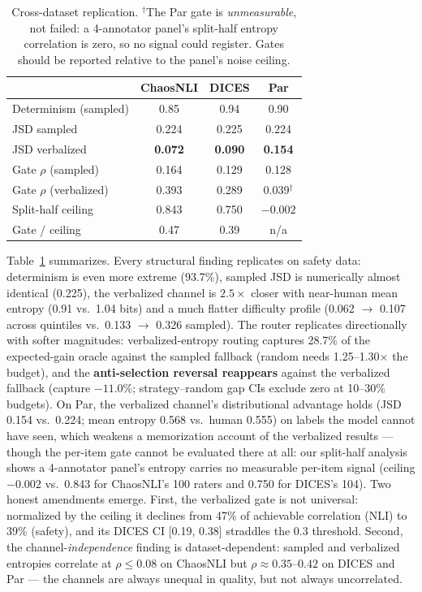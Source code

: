 \documentclass[11pt]{article}
\begin{document}
\begin{table}[t]
\centering
\small
\setlength{\tabcolsep}{3.5pt}
\begin{tabular}{lccc}
\toprule
 & ChaosNLI & DICES & Par \\
\midrule
Determinism (sampled) & 0.85 & 0.94 & 0.90 \\
JSD sampled & 0.224 & 0.225 & 0.224 \\
JSD verbalized & \textbf{0.072} & \textbf{0.090} & \textbf{0.154} \\
Gate $\rho$ (sampled) & 0.164 & 0.129 & 0.128 \\
Gate $\rho$ (verbalized) & 0.393 & 0.289 & 0.039$^{\dagger}$ \\
Split-half ceiling & 0.843 & 0.750 & $-0.002$ \\
Gate / ceiling & 0.47 & 0.39 & n/a \\
\bottomrule
\end{tabular}
\caption{Cross-dataset replication. $^{\dagger}$The Par gate is \emph{unmeasurable}, not failed: a 4-annotator panel's split-half entropy correlation is zero, so no signal could register. Gates should be reported relative to the panel's noise ceiling.}
\label{tab:generalize}
\end{table}

Table~\ref{tab:generalize} summarizes. Every structural finding replicates on safety data: determinism is even more extreme (93.7\%), sampled JSD is numerically almost identical (0.225), the verbalized channel is $2.5\times$ closer with near-human mean entropy (0.91 vs.\ 1.04 bits) and a much flatter difficulty profile (0.062 $\rightarrow$ 0.107 across quintiles vs.\ 0.133 $\rightarrow$ 0.326 sampled). The router replicates directionally with softer magnitudes: verbalized-entropy routing captures 28.7\% of the expected-gain oracle against the sampled fallback (random needs 1.25--1.30$\times$ the budget), and the \textbf{anti-selection reversal reappears} against the verbalized fallback (capture $-11.0$\%; strategy--random gap CIs exclude zero at 10--30\% budgets). On Par, the verbalized channel's distributional advantage holds (JSD 0.154 vs.\ 0.224; mean entropy 0.568 vs.\ human 0.555) on labels the model cannot have seen, which weakens a memorization account of the verbalized results --- though the per-item gate cannot be evaluated there at all: our split-half analysis shows a 4-annotator panel's entropy carries no measurable per-item signal (ceiling $-0.002$ vs.\ 0.843 for ChaosNLI's 100 raters and 0.750 for DICES's 104). Two honest amendments emerge. First, the verbalized gate is not universal: normalized by the ceiling it declines from 47\% of achievable correlation (NLI) to 39\% (safety), and its DICES CI [0.19, 0.38] straddles the 0.3 threshold. Second, the channel-\emph{independence} finding is dataset-dependent: sampled and verbalized entropies correlate at $\rho \leq 0.08$ on ChaosNLI but $\rho \approx 0.35$--$0.42$ on DICES and Par --- the channels are always unequal in quality, but not always uncorrelated.
\end{document}
